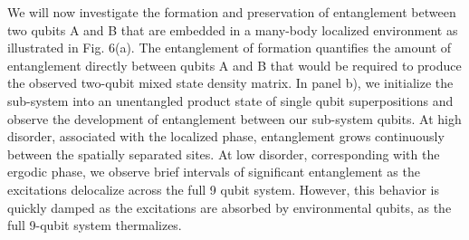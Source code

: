 We will now investigate the formation and preservation of entanglement between two qubits A and B that are embedded in a many-body localized environment as illustrated in Fig. 6(a).
The entanglement of formation quantifies the amount of entanglement directly between qubits A and B that would be required to produce the observed two-qubit mixed state density matrix.\autocite{Wootters1998}
In panel b), we initialize the sub-system into an unentangled product state of single qubit superpositions and observe the development of entanglement between our sub-system qubits.
At high disorder, associated with the localized phase, entanglement grows continuously between the spatially separated sites.
At low disorder, corresponding with the ergodic phase, we observe brief intervals of significant entanglement as the excitations delocalize across the full 9 qubit system.
However, this behavior is quickly damped as the excitations are absorbed by environmental qubits, as the full 9-qubit system thermalizes.


